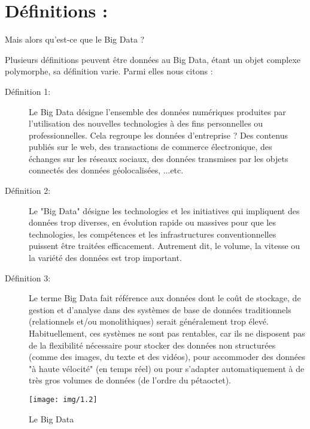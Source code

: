 \section{Définitions : }
\begin{center}
	\color[rgb]{0.2, 0.6, 0.2} Mais alors qu'est-ce que le Big Data ?
\end{center}

Plusieurs définitions peuvent être données au Big Data, étant un objet complexe polymorphe, sa définition varie. Parmi elles nous citons :

\begin{description}
	\item[Définition 1:]Le Big Data désigne l'ensemble des données numériques produites par l'utilisation des nouvelles technologies à des fins personnelles ou professionnelles. Cela regroupe les données d'entreprise ? Des contenus publiés sur le web, des transactions de commerce électronique, des échanges sur les réseaux sociaux, des données transmises par les objets connectés des données géolocalisées, ...etc.
	\item[Définition 2:]Le "Big Data" désigne les technologies et les initiatives qui impliquent des données trop diverses, en évolution rapide ou massives pour que les technologies, les compétences et les infrastructures conventionnelles puissent être traitées efficacement. Autrement dit, le volume, la vitesse ou la variété des données est trop important.
	\item[Définition 3:]Le terme Big Data fait référence aux données dont le coût de stockage, de gestion et d'analyse dans des systèmes de base de données traditionnels (relationnels et/ou monolithiques) serait généralement trop élevé. Habituellement, ces systèmes ne sont pas rentables, car ils ne disposent pas de la flexibilité nécessaire pour stocker des données non structurées (comme des images, du texte et des vidéos), pour accommoder des données "à haute vélocité" (en temps réel) ou pour s'adapter automatiquement à de très gros volumes de données (de l'ordre du pétaoctet).
\end{description}

\begin{figure}[h]
	\centering
	\texttt{[image: img/1.2]}
	\caption{Le Big Data}
\end{figure}